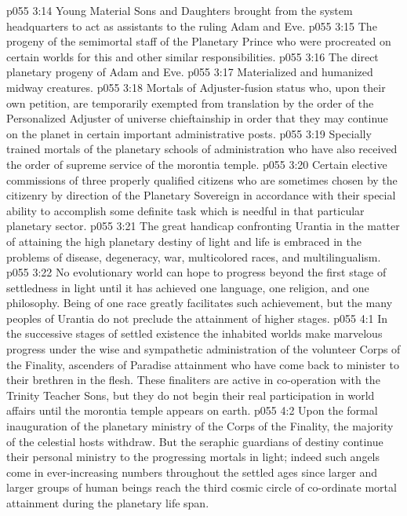 \pc \vs p055 3:14 \bibnobreakspace Young Material Sons and Daughters brought from the system headquarters to act as assistants to the ruling Adam and Eve.
\vs p055 3:15 \bibnobreakspace The progeny of the semimortal staff of the Planetary Prince who were procreated on certain worlds for this and other similar responsibilities.
\vs p055 3:16 \bibnobreakspace The direct planetary progeny of Adam and Eve.
\vs p055 3:17 \bibnobreakspace Materialized and humanized midway creatures.
\vs p055 3:18 \bibnobreakspace Mortals of Adjuster\hyp{}fusion status who, upon their own petition, are temporarily exempted from translation by the order of the Personalized Adjuster of universe chieftainship in order that they may continue on the planet in certain important administrative posts.
\vs p055 3:19 \bibnobreakspace Specially trained mortals of the planetary schools of administration who have also received the order of supreme service of the morontia temple.
\vs p055 3:20 \bibnobreakspace Certain elective commissions of three properly qualified citizens who are sometimes chosen by the citizenry by direction of the Planetary Sovereign in accordance with their special ability to accomplish some definite task which is needful in that particular planetary sector.
\pc \vs p055 3:21 The great handicap confronting Urantia in the matter of attaining the high planetary destiny of light and life is embraced in the problems of disease, degeneracy, war, multicolored races, and multilingualism.
\vs p055 3:22 No evolutionary world can hope to progress beyond the first stage of settledness in light until it has achieved one language, one religion, and one philosophy. Being of one race greatly facilitates such achievement, but the many peoples of Urantia do not preclude the attainment of higher stages.
\vs p055 4:1 In the successive stages of settled existence the inhabited worlds make marvelous progress under the wise and sympathetic administration of the volunteer Corps of the Finality, ascenders of Paradise attainment who have come back to minister to their brethren in the flesh. These finaliters are active in co\hyp{}operation with the Trinity Teacher Sons, but they do not begin their real participation in world affairs until the morontia temple appears on earth.
\vs p055 4:2 Upon the formal inauguration of the planetary ministry of the Corps of the Finality, the majority of the celestial hosts withdraw. But the seraphic guardians of destiny continue their personal ministry to the progressing mortals in light; indeed such angels come in ever\hyp{}increasing numbers throughout the settled ages since larger and larger groups of human beings reach the third cosmic circle of co\hyp{}ordinate mortal attainment during the planetary life span.
